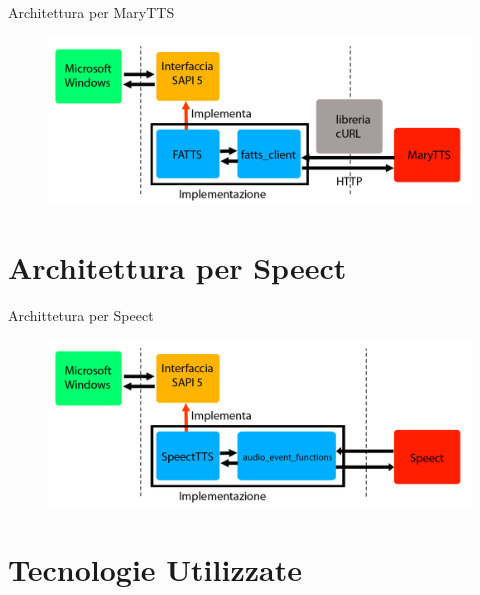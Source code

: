 \documentclass{beamer}
\begin{document}
	\begin{frame}{Architettura per MaryTTS}
		\begin{figure}[H]
			\centering
			\includegraphics[width=\textwidth]{images/FATTS-sapi5.png}
		\end{figure}
	\end{frame}

	\section{Architettura per Speect}
	
	\begin{frame}{Archittetura per Speect}
		\begin{figure}[H]
			\centering
			\includegraphics[width=\textwidth]{images/SpeectTTS-sapi5.png}
		\end{figure}
	\end{frame}

	\section{Tecnologie Utilizzate}
	
\end{document}
